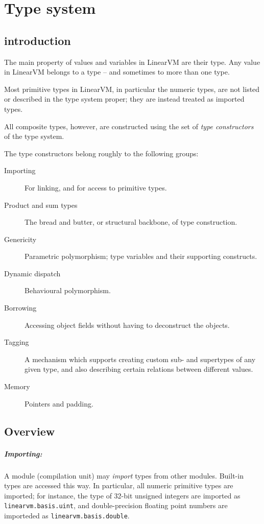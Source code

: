 \documentclass[a4paper]{report}
\begin{document}
\chapter{Type system}
\label{chap:typesystem}

\section{introduction}

The main property of values and variables in LinearVM are their type.
Any value in LinearVM belongs to a type -- and sometimes to more than
one type.

Most primitive types in LinearVM, in particular the numeric types, are
not listed or described in the type system proper; they are instead
treated as imported types.

All composite types, however, are constructed using the set of
\emph{type constructors} of the type system.

The type constructors belong roughly to the following groups:
\begin{description}
\item[Importing] For linking, and for access to primitive types.
\item[Product and sum types] The bread and butter, or structural
  backbone, of type construction.
\item[Genericity] Parametric polymorphism; type variables and their
  supporting constructs.
\item[Dynamic dispatch] Behavioural polymorphism.
\item[Borrowing] Accessing object fields without having to deconstruct
  the objects.
\item[Tagging] A mechanism which supports creating custom sub- and
  supertypes of any given type, and also describing certain relations
  between different values.
\item[Memory] Pointers and padding.
\end{description}


\section{Overview}

\paragraph{Importing:}
A module (compilation unit) may \emph{import} types from other modules.
Built-in types are accessed this way.
In particular, all numeric primitive types are imported; for instance,
the type of 32-bit unsigned integers are imported as
\texttt{linearvm.basis.uint}, and double-precision floating point
numbers are importeded as \texttt{linearvm.basis.double}.
\end{document}
